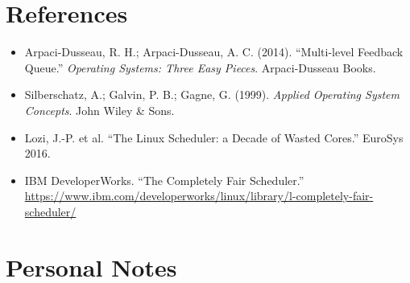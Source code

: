 \documentclass[11pt]{article}
\begin{document}
\section{References}

\begin{itemize}
    \item Arpaci-Dusseau, R. H.; Arpaci-Dusseau, A. C. (2014). ``Multi-level Feedback Queue.'' \textit{Operating Systems: Three Easy Pieces}. Arpaci-Dusseau Books.
    \item Silberschatz, A.; Galvin, P. B.; Gagne, G. (1999). \textit{Applied Operating System Concepts}. John Wiley \& Sons.
    \item Lozi, J.-P. et al. ``The Linux Scheduler: a Decade of Wasted Cores.'' EuroSys 2016.
    \item IBM DeveloperWorks. ``The Completely Fair Scheduler.'' \url{https://www.ibm.com/developerworks/linux/library/l-completely-fair-scheduler/}
\end{itemize}

\section*{Personal Notes}
\end{document}
